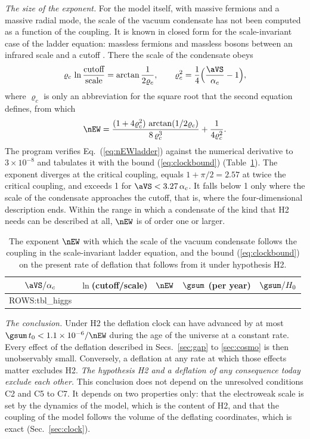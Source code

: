 \emph{The size of the exponent.} For the model itself, with massive fermions and a massive radial
mode, the scale of the vacuum condensate has not been computed as a function of the coupling. It is
known in closed form for the scale-invariant case of the ladder equation: massless
fermions and massless bosons between an infrared scale and a cutoff \cite{Miransky1985}. There the
scale of the condensate obeys
\begin{equation}
\varrho_c\,\ln\frac{\text{cutoff}}{\text{scale}}=\arctan\frac{1}{2\varrho_c},\qquad
\varrho_c^{2}=\frac14\Big(\frac{\aVS}{\alpha_c}-1\Big),
\end{equation}
where $\varrho_c$ is only an abbreviation for the square root that the second equation defines, from
which
\begin{equation}
\nEW=\frac{(1+4\varrho_c^{2})\,\arctan(1/2\varrho_c)}{8\,\varrho_c^{3}}+\frac{1}{4\varrho_c^{2}}.
\label{eq:nEWladder}
\end{equation}
The program verifies Eq.~(\ref{eq:nEWladder}) against the numerical derivative to $3\times10^{-8}$
and tabulates it with the bound (\ref{eq:clockbound}) (Table~\ref{tab:higgs}). The exponent diverges
at the critical coupling, equals $1+\pi/2=2.57$ at twice the critical coupling, and exceeds 1 for
$\aVS<3.27\,\alpha_c$. It falls below 1 only where the scale of the condensate approaches the cutoff,
that is, where the four-dimensional description ends. Within the range in which a condensate of the
kind that H2 needs can be described at all, $\nEW$ is of order one or larger.

\begin{table}
\caption{\label{tab:higgs}The exponent $\nEW$ with which the scale of the vacuum condensate follows
the coupling in the scale-invariant ladder equation, and the bound (\ref{eq:clockbound}) on the
present rate of deflation that follows from it under hypothesis H2.}
\begin{ruledtabular}
\begin{tabular}{ccccc}
$\aVS/\alpha_c$ & $\ln$(cutoff/scale) & $\nEW$ & $\gsum$ (per year) & $\gsum/H_0$ \\
\hline
{{ROWS:tbl_higgs}}
\end{tabular}
\end{ruledtabular}
\end{table}

\emph{The conclusion.} Under H2 the deflation clock can have advanced by at most
$\gsum\,t_0<1.1\times10^{-6}/\nEW$ during the age of the universe at a constant rate. Every effect of
the deflation described in Secs.~\ref{sec:gap} to \ref{sec:cosmo} is then unobservably small.
Conversely, a deflation at any rate at which those effects matter excludes H2. \emph{The hypothesis
H2 and a deflation of any consequence today exclude each other.} This conclusion does not depend on
the unresolved conditions C2 and C5 to C7. It depends on two properties only: that the electroweak
scale is set by the dynamics of the model, which is the content of H2, and that the coupling of the
model follows the volume of the deflating coordinates, which is exact (Sec.~\ref{sec:clock}).

